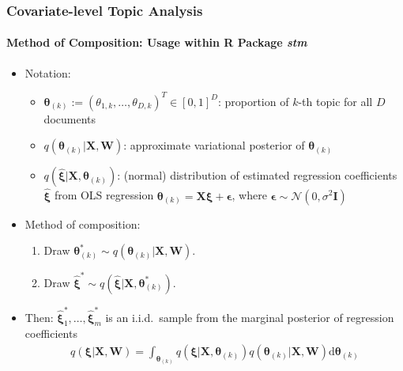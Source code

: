 \documentclass[xcolor=dvipsnames]{beamer}
\begin{document}
\begin{frame}
\frametitle{Covariate-level Topic Analysis}
\framesubtitle{Method of Composition: Usage within R Package \textit{stm}}
\begin{itemize}
\item Notation:
\begin{itemize}
\item $\boldsymbol{\theta}_{(k)}:=(\theta_{1,k}, \dots, \theta_{D,k})^T \in [0,1]^{D}$: proportion of $k$-th topic for all $D$ documents
\item $q(\boldsymbol{\theta}_{(k)} | \boldsymbol{X}, \boldsymbol{W})$: approximate variational posterior of $\boldsymbol{\theta}_{(k)}$
\item $q(\hat{\boldsymbol{\xi}} | \boldsymbol{X}, \boldsymbol{\theta}_{(k)})$: (normal) distribution of estimated regression coefficients $\hat{\boldsymbol{\xi}}$ from OLS regression $\boldsymbol{\theta}_{(k)} = \boldsymbol{X}\boldsymbol{\xi} + \boldsymbol{\epsilon}$, where $\boldsymbol{\epsilon} \sim \mathcal{N}(0,\sigma^2\boldsymbol{I})$
\end{itemize}
\item Method of composition:
\begin{enumerate}[{1)}]
\item Draw $\boldsymbol{\theta}_{(k)}^* \sim q(\boldsymbol{\theta}_{(k)} | \boldsymbol{X}, \boldsymbol{W})$.
\item Draw $\hat{\boldsymbol{\xi}}^* \sim q(\hat{\boldsymbol{\xi}} | \boldsymbol{X}, \boldsymbol{\theta}_{(k)}^*)$.
\end{enumerate}
\item Then: $\hat{\boldsymbol{\xi}}_1^*, \dots, \hat{\boldsymbol{\xi}}_m^*$ is an i.i.d.\ sample from the marginal posterior of regression coefficients
\begin{align*}
q(\boldsymbol{\xi} | \boldsymbol{X}, \boldsymbol{W}) = \int_{\boldsymbol{\theta}_{(k)}} q(\boldsymbol{\xi} | \boldsymbol{X}, \boldsymbol{\theta}_{(k)}) q(\boldsymbol{\theta}_{(k)} | \boldsymbol{X}, \boldsymbol{W}) \text{d} \boldsymbol{\theta}_{(k)} 
\end{align*}
\end{itemize}
\end{frame}
\end{document}
